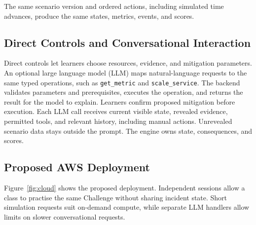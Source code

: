 \documentclass[11pt,a4paper]{article}
\begin{document}
The same scenario version and ordered actions, including simulated time
advances, produce the same states, metrics, events, and scores.

\subsection{Direct Controls and Conversational Interaction}
Direct controls let learners choose resources, evidence, and mitigation
parameters. An optional large language model (LLM) maps natural-language
requests to the same typed operations, such as \texttt{get\_metric} and
\texttt{scale\_service}. The backend validates parameters and prerequisites,
executes the operation, and
returns the result for the model to explain. Learners confirm proposed
mitigation before execution. Each LLM call receives current visible state,
revealed evidence, permitted tools, and relevant history, including manual
actions. Unrevealed scenario data stays outside the prompt. The engine owns
state, consequences, and scores.

\newpage
\subsection{Proposed AWS Deployment}
Figure~\ref{fig:cloud} shows the proposed deployment. Independent sessions
allow a class to practise the same Challenge without sharing incident state.
Short simulation requests suit on-demand compute, while separate LLM handlers
allow limits on slower conversational requests.
\end{document}
